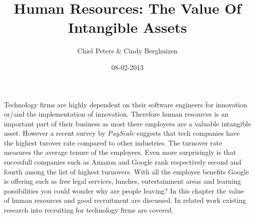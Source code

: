 \documentclass{article}
\begin{document}
\title{Human Resources: The Value Of Intangible Assets}
\author{Chiel Peters \& Cindy Berghuizen}
\date{08-02-2013}
\maketitle

\setlength\parindent{0pt}

Technology firms are highly dependent on their software engineers for innovation or/and the implementation of innovation. Therefore human resources is an important part of their business as most there employees are a valuable intangible asset. However a recent survey by \textit{PayScale} \cite{turnover} suggests that tech companies have the highest turover rate compared to other industries. The turnover rate measures the average tenure of the employees. Even more surprisingly is that succesfull companies such as Amazon and Google rank respectively second and fourth among the list of highest turnovers. With all the employee benefits Google is offering such as free legal services, lunches, entertainment areas and learning possibilities you could wonder why are people leaving? In this chapter the value of human resources and good recruitment are discussed. In related work existing research into recruiting for technology firms are covered.
\end{document}

